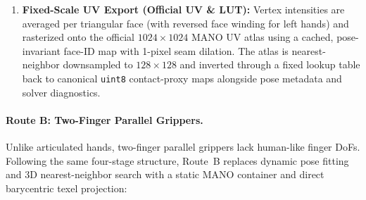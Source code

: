 \begin{enumerate}[leftmargin=*,nosep]
    \item \textbf{Fixed-Scale UV Export (Official UV \& LUT):} Vertex intensities are averaged per triangular face (with reversed face winding for left hands) and rasterized onto the official $1024\times 1024$ MANO UV atlas using a cached, pose-invariant face-ID map with 1-pixel seam dilation. The atlas is nearest-neighbor downsampled to $128\times 128$ and inverted through a fixed lookup table back to canonical \texttt{uint8} contact-proxy maps alongside pose metadata and solver diagnostics.
\end{enumerate}

\paragraph{Route B: Two-Finger Parallel Grippers.}
Unlike articulated hands, two-finger parallel grippers lack human-like finger DoFs. Following the same four-stage structure, Route~B replaces dynamic pose fitting and 3D nearest-neighbor search with a static MANO container and direct barycentric texel projection:
